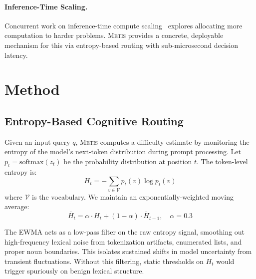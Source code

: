 \documentclass[11pt,a4paper]{article}
\newcommand{\metis}{\textsc{Metis}}
\begin{document}
\paragraph{Inference-Time Scaling.}
Concurrent work on inference-time compute scaling~\citep{snell2024scaling} explores allocating more computation to harder problems. \metis{} provides a concrete, deployable mechanism for this via entropy-based routing with sub-microsecond decision latency.

\section{Method}
\label{sec:method}

\subsection{Entropy-Based Cognitive Routing}
\label{sec:routing}

Given an input query $q$, \metis{} computes a difficulty estimate by monitoring the entropy of the model's next-token distribution during prompt processing. Let $p_t = \text{softmax}(z_t)$ be the probability distribution at position $t$. The token-level entropy is:
\begin{equation}
    H_t = -\sum_{v \in \mathcal{V}} p_t(v) \log p_t(v)
    \label{eq:entropy}
\end{equation}
where $\mathcal{V}$ is the vocabulary. We maintain an exponentially-weighted moving average:
\begin{equation}
    \bar{H}_t = \alpha \cdot H_t + (1 - \alpha) \cdot \bar{H}_{t-1}, \quad \alpha = 0.3
    \label{eq:ewma}
\end{equation}

The EWMA acts as a low-pass filter on the raw entropy signal, smoothing out high-frequency lexical noise from tokenization artifacts, enumerated lists, and proper noun boundaries. This isolates sustained shifts in model uncertainty from transient fluctuations. Without this filtering, static thresholds on $H_t$ would trigger spuriously on benign lexical structure.
\end{document}
